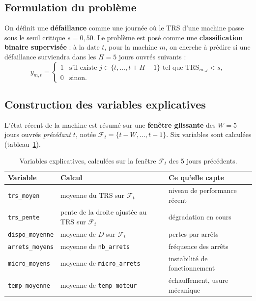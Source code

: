 \documentclass[11pt,a4paper]{article}
\newcommand{\code}[1]{\texttt{#1}}
\begin{document}
\subsection{Formulation du problème}
On définit une \textbf{défaillance} comme une journée où le TRS d'une machine passe sous le seuil
critique $s = 0{,}50$. Le problème est posé comme une \textbf{classification binaire supervisée} :
à la date $t$, pour la machine $m$, on cherche à prédire si une défaillance surviendra dans les
$H = 5$ jours ouvrés suivants :
\begin{equation}
y_{m,t} = \begin{cases}
1 & \text{s'il existe } j \in \{t, \dots, t+H-1\} \text{ tel que } \mathrm{TRS}_{m,j} < s,\\
0 & \text{sinon.}
\end{cases}
\end{equation}

\subsection{Construction des variables explicatives}
L'état récent de la machine est résumé sur une \textbf{fenêtre glissante} des $W = 5$ jours
ouvrés \emph{précédant} $t$, notée $\mathcal{F}_t = \{t-W, \dots, t-1\}$. Six variables sont
calculées (tableau~\ref{tab:features}).

\begin{table}[ht]
\centering\small
\caption{Variables explicatives, calculées sur la fenêtre $\mathcal{F}_t$ des 5 jours précédents.}
\label{tab:features}
\begin{tabularx}{\textwidth}{@{}l l X@{}}
\toprule
\textbf{Variable} & \textbf{Calcul} & \textbf{Ce qu'elle capte} \\
\midrule
\code{trs\_moyen}     & moyenne du TRS sur $\mathcal{F}_t$ & niveau de performance récent \\
\code{trs\_pente}     & pente de la droite ajustée au TRS sur $\mathcal{F}_t$ & dégradation en cours \\
\code{dispo\_moyenne} & moyenne de $D$ sur $\mathcal{F}_t$ & pertes par arrêts \\
\code{arrets\_moyens} & moyenne de \code{nb\_arrets} & fréquence des arrêts \\
\code{micro\_moyens}  & moyenne de \code{micro\_arrets} & instabilité de fonctionnement \\
\code{temp\_moyenne}  & moyenne de \code{temp\_moteur} & échauffement, usure mécanique \\
\bottomrule
\end{tabularx}
\end{table}
\end{document}
